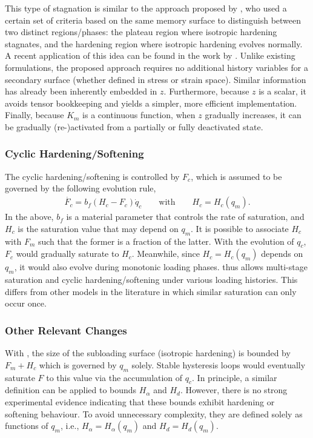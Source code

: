 This type of stagnation is similar to the approach proposed by \citet{Ucak2011,Ucak2012}, who used a certain set of criteria based on the same memory surface \citep{Ohno1982} to distinguish between two distinct regions/phases: the plateau region where isotropic hardening stagnates, and the hardening region where isotropic hardening evolves normally.
A recent application of this idea can be found in the work by \citet{Hu2018}.
Unlike existing formulations, the proposed approach  requires no additional history variables for a secondary surface (whether defined in stress or strain space).
Similar information has already been inherently embedded in $z$.
Furthermore, because $z$ is a scalar, it avoids tensor bookkeeping and yields a simpler, more efficient implementation.
Finally, because $K_m$ is a continuous function, when $z$ gradually increases, it can be gradually (re-)activated from a partially or fully deactivated state.
\subsubsection{Cyclic Hardening/Softening}
The cyclic hardening/softening is controlled by $F_c$, which is assumed to be governed by the following evolution rule,
\begin{gather}\label{eq:fc}
\boxed{\dot{F_c}=b_f\left(H_c-F_c\right)\dot{q}_c\qquad\text{with}\qquad{}H_c=H_c\left(q_m\right).}
\end{gather}
In the above, $b_f$ is a material parameter that controls the rate of saturation, and $H_c$ is the saturation value that may depend on $q_m$.
It is possible to associate $H_c$ with $F_m$ such that the former is a fraction of the latter.
With the evolution of $q_c$, $F_c$ would gradually saturate to $H_c$.
Meanwhile, since $H_c=H_c\left(q_m\right)$ depends on $q_m$, it would also evolve during monotonic loading phases.
 thus allows multi-stage saturation and cyclic hardening/softening under various loading histories.
This differs from other models in the literature \citep[e.g.,][]{Ohno1982,Zheng2026} in which similar saturation can only occur once.
\subsubsection{Other Relevant Changes}
With , the size of the subloading surface (isotropic hardening) is bounded by $F_m+H_c$ which is governed by $q_m$ solely.
Stable hysteresis loops would eventually saturate $F$ to this value via the accumulation of $q_c$.
In principle, a similar definition can be applied to bounds $H_\alpha$ and $H_d$.
However, there is no strong experimental evidence indicating that these bounds exhibit hardening or softening behaviour.
To avoid unnecessary complexity, they are defined solely as functions of $q_m$, i.e., $H_\alpha=H_\alpha\left(q_m\right)$ and $H_d=H_d\left(q_m\right)$.
